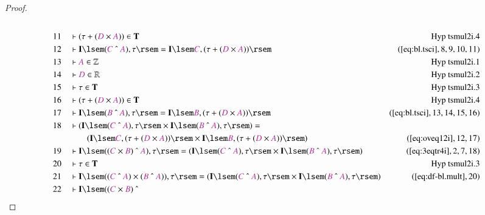\begin{proof}
\begin{align}
  \\ 11 &&  & \vdash ( \tau + ( \mc{D} \times \mc{A} ) ) \in
      \mathbf{T}&\text{Hyp~tsmul2i.4}\notag%
  \\ 12 &&  & \vdash \mathbf{I} \lsem ( \mc{C} ~\string^~ \mc{A} ) , \tau \rsem
      = \mathbf{I} \lsem \mc{C} , ( \tau + ( \mc{D} \times
      \mc{A} ) )
      \rsem&(\mbox{\ref{eq:bl.tsci}},8,9,10,11)\notag
  \\ 13 &&  & \vdash \mc{A} \in
      \mathbb{Z}&\text{Hyp~tsmul2i.1}\notag%
  \\ 14 &&  & \vdash \mc{D} \in
      \mathbb{R}&\text{Hyp~tsmul2i.2}\notag%
  \\ 15 &&  & \vdash \tau \in
      \mathbf{T}&\text{Hyp~tsmul2i.3}\notag%
  \\ 16 &&  & \vdash ( \tau + ( \mc{D} \times \mc{A} ) ) \in
      \mathbf{T}&\text{Hyp~tsmul2i.4}\notag%
  \\ 17 &&  & \vdash \mathbf{I} \lsem ( \mc{B} ~\string^~ \mc{A} ) , \tau \rsem
      = \mathbf{I} \lsem \mc{B} , ( \tau + ( \mc{D} \times
      \mc{A} ) )
      \rsem&(\mbox{\ref{eq:bl.tsci}},13,14,15,16)\notag
  \\ 18 &&  & \vdash ( \mathbf{I} \lsem ( \mc{C} ~\string^~ \mc{A} ) , \tau
      \rsem \times \mathbf{I} \lsem ( \mc{B} ~\string^~
      \mc{A} ) , \tau \rsem ) =  \notag \\ & & & \qquad
     ( \mathbf{I} \lsem \mc{C} ,
      ( \tau + ( \mc{D} \times \mc{A} ) ) \rsem \times
      \mathbf{I} \lsem \mc{B} , ( \tau + ( \mc{D} \times
      \mc{A} ) ) \rsem
      )&(\mbox{\ref{eq:oveq12i}},12,17)\notag
  \\ 19 &&  & \vdash \mathbf{I} \lsem ( ( \mc{C} \times \mc{B} ) ~\string^~
      \mc{A} ) , \tau \rsem = ( \mathbf{I} \lsem ( \mc{C}
      ~\string^~ \mc{A} ) , \tau \rsem \times \mathbf{I}
      \lsem ( \mc{B} ~\string^~ \mc{A} ) , \tau \rsem
      )&(\mbox{\ref{eq:3eqtr4i}},2,7,18)\notag
  \\ 20 &&  & \vdash \tau \in
      \mathbf{T}&\text{Hyp~tsmul2i.3}\notag%
  \\ 21 &&  & \vdash \mathbf{I} \lsem ( ( \mc{C} ~\string^~ \mc{A} ) \times (
      \mc{B} ~\string^~ \mc{A} ) ) , \tau \rsem = (
      \mathbf{I} \lsem ( \mc{C} ~\string^~ \mc{A} ) , \tau
      \rsem \times \mathbf{I} \lsem ( \mc{B} ~\string^~
      \mc{A} ) , \tau \rsem
      )&(\mbox{\ref{eq:df-bl.mult}},20)\notag
  \\ 22 &&  & \vdash \mathbf{I} \lsem ( ( \mc{C} \times \mc{B} ) ~\string^~

\end{align}
\end{proof}

